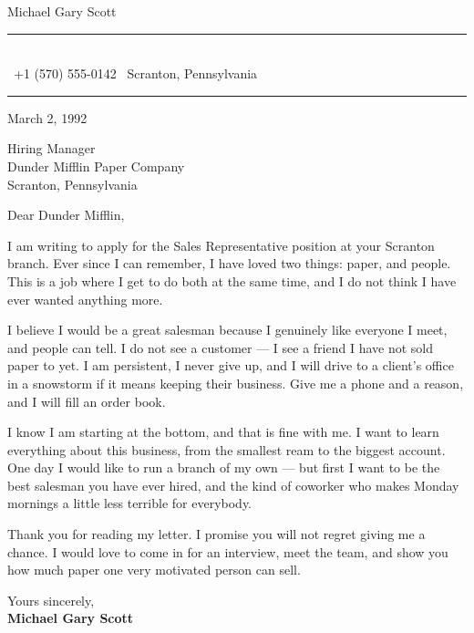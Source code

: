 \documentclass[a4paper,11pt]{article}
\begin{document}
\begin{center}
  {\Huge\color{accentTitle} Michael Gary Scott}\\[10pt]
  {\color{accentLine}\rule{\linewidth}{0.4pt}}\\[6pt]
  \footnotesize
  \faPhone\ +1 (570) 555-0142 \quad\textbullet\quad
  \faMapMarker*\ Scranton, Pennsylvania\\[6pt]
  {\color{accentLine}\rule{\linewidth}{0.4pt}}
\end{center}

\vspace{6pt}

March 2, 1992
\vspace{2pt}

Hiring Manager\\
Dunder Mifflin Paper Company\\
Scranton, Pennsylvania

\vspace{4pt}
Dear Dunder Mifflin,

\justifying

I am writing to apply for the Sales Representative position at your Scranton branch. Ever
since I can remember, I have loved two things: paper, and people. This is a job where I get
to do both at the same time, and I do not think I have ever wanted anything more.

I believe I would be a great salesman because I genuinely like everyone I meet, and people
can tell. I do not see a customer --- I see a friend I have not sold paper to yet. I am
persistent, I never give up, and I will drive to a client's office in a snowstorm if it
means keeping their business. Give me a phone and a reason, and I will fill an order book.

I know I am starting at the bottom, and that is fine with me. I want to learn everything
about this business, from the smallest ream to the biggest account. One day I would like to
run a branch of my own --- but first I want to be the best salesman you have ever hired, and
the kind of coworker who makes Monday mornings a little less terrible for everybody.

Thank you for reading my letter. I promise you will not regret giving me a chance. I would
love to come in for an interview, meet the team, and show you how much paper one very
motivated person can sell.

\vspace{10pt}
Yours sincerely,\\[6pt]
\textbf{Michael Gary Scott}
\end{document}

